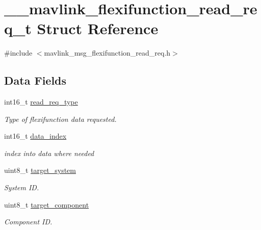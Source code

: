 \hypertarget{struct____mavlink__flexifunction__read__req__t}{\section{\+\_\+\+\_\+mavlink\+\_\+flexifunction\+\_\+read\+\_\+req\+\_\+t Struct Reference}
\label{struct____mavlink__flexifunction__read__req__t}
}


{\ttfamily \#include $<$mavlink\+\_\+msg\+\_\+flexifunction\+\_\+read\+\_\+req.\+h$>$}

\subsection*{Data Fields}
\begin{DoxyCompactItemize}
\item 
int16\+\_\+t \hyperlink{struct____mavlink__flexifunction__read__req__t_ad125d4a58d3e7c72180996e25552248e}{read\+\_\+req\+\_\+type}
\begin{DoxyCompactList}\small\item\em Type of flexifunction data requested. \end{DoxyCompactList}\item 
int16\+\_\+t \hyperlink{struct____mavlink__flexifunction__read__req__t_ab181099ed76ab1a8332d11ef69ba17f7}{data\+\_\+index}
\begin{DoxyCompactList}\small\item\em index into data where needed \end{DoxyCompactList}\item 
uint8\+\_\+t \hyperlink{struct____mavlink__flexifunction__read__req__t_a936f700ccd88d872d9e1dceae4b3fa13}{target\+\_\+system}
\begin{DoxyCompactList}\small\item\em System I\+D. \end{DoxyCompactList}\item 
uint8\+\_\+t \hyperlink{struct____mavlink__flexifunction__read__req__t_a8416530b6c4166d187f20abfc8e9c85e}{target\+\_\+component}
\begin{DoxyCompactList}\small\item\em Component I\+D. \end{DoxyCompactList}\end{DoxyCompactItemize}


